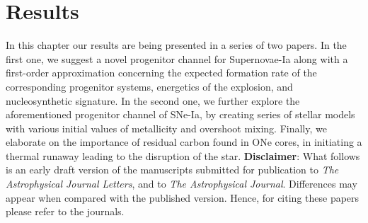 \documentclass[../../main/thesis_msc.tex]{subfiles}
\begin{document}
	\chapter{Results}
	
	
	In this chapter our results are being presented in a series of two papers. In the first one, we suggest a novel progenitor channel for Supernovae-Ia along with a first-order approximation concerning the expected formation rate of the corresponding progenitor systems, energetics of the explosion, and nucleosynthetic signature. In the second one, we further explore the aforementioned progenitor channel of SNe-Ia, by creating series of stellar models with various initial values of metallicity and overshoot mixing. Finally, we elaborate on the importance of residual carbon found in ONe cores, in initiating a thermal runaway leading to the disruption of the star.
	\newline
	\noindent \textbf{Disclaimer}: What follows is an early draft version of the manuscripts submitted for publication to \textit{The Astrophysical Journal Letters}, and to \textit{The Astrophysical Journal}. Differences may appear when compared with the published version. Hence, for citing these papers please refer to the journals.
	
	\newpage
	\thispagestyle{empty}
     \null\newpage
	
		
            
           
            
     \thispagestyle{empty}
     \null\newpage
     
\end{document}
